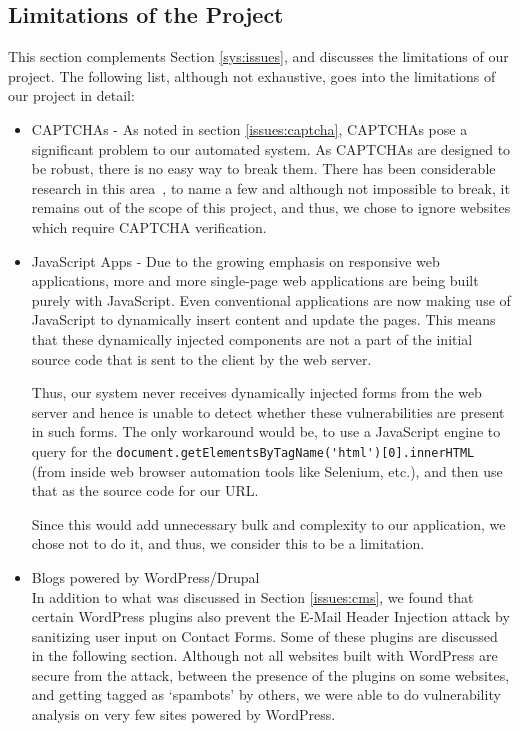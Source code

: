 \subsection[Limitations]{Limitations of the Project}
\label{limitations}
	This section complements Section \ref{sys:issues}, and discusses the limitations of our project. The following list, although not exhaustive, goes into the limitations of our project in detail: 
	\begin{itemize}
		\item CAPTCHAs - As noted in section \ref*{issues:captcha}, CAPTCHAs pose a significant problem to our automated system. As CAPTCHAs are designed to be robust, there is no easy way to break them. There has been considerable research in this area~\cite{captchas2}, \cite{captchas} to name a few and although not impossible to break, it remains out of the scope of this project, and thus, we chose to ignore websites which require CAPTCHA verification.
		\item JavaScript Apps - Due to the growing emphasis on responsive web applications, more and more single-page web applications are being built purely with JavaScript. Even conventional applications are now making use of JavaScript to dynamically insert content and update the pages. This means that these dynamically injected components are not a part of the initial source code that is sent to the client by the web server.
		
		Thus, our system never receives dynamically injected forms from the web server and hence is unable to detect whether these vulnerabilities are present in such forms. The only workaround would be, to use a JavaScript engine to query for the \lstinline|document.getElementsByTagName('html')[0].innerHTML| (from inside web browser automation tools like Selenium, etc.), and then use that as the source code for our URL.
		
		Since this would add unnecessary bulk and complexity to our application, we chose not to do it, and thus, we consider this to be a limitation.
		
		\item Blogs powered by WordPress/Drupal\\
        In addition to what was discussed in Section \ref{issues:cms}, we found that certain WordPress plugins also prevent the E-Mail Header Injection attack by sanitizing user input on Contact Forms. Some of these plugins are discussed in the following section. Although not all websites built with WordPress are secure from the attack, between the presence of the plugins on some websites, and getting tagged as `spambots' by others, we were able to do vulnerability analysis on very few sites powered by WordPress.
		

\end{itemize}
